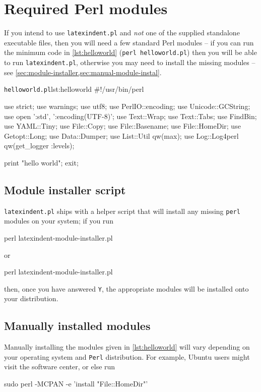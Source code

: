 \appendix
	\section{Required Perl modules}\label{sec:requiredmodules}
	 If you intend to use \texttt{latexindent.pl} and \emph{not} one of the
	 supplied standalone executable files, then you will need a few standard Perl modules --
	 if you can run the minimum code in \cref{lst:helloworld} (\texttt{perl helloworld.pl}) then you will be able to run
	 \texttt{latexindent.pl}, otherwise you may need to install the missing modules -- see
	 \cref{sec:module-installer,sec:manual-module-instal}.

	 \begin{cmhlistings}[style=tcblatex,language=Perl]{\texttt{helloworld.pl}}{lst:helloworld}
#!/usr/bin/perl

use strict;
use warnings;
use utf8;
use PerlIO::encoding;
use Unicode::GCString;
use open ':std', ':encoding(UTF-8)';
use Text::Wrap;
use Text::Tabs;
use FindBin;
use YAML::Tiny;
use File::Copy;
use File::Basename;
use File::HomeDir;
use Getopt::Long;
use Data::Dumper;
use List::Util qw(max);
use Log::Log4perl qw(get_logger :levels);

print "hello world";
exit;
\end{cmhlistings}

	\subsection{Module installer script}\label{sec:module-installer}
		 \texttt{latexindent.pl} ships with a helper script that will
		install any missing \texttt{perl} modules on your system; if you run
		\begin{commandshell}
perl latexindent-module-installer.pl
     \end{commandshell}
		or
		\begin{dosprompt}
perl latexindent-module-installer.pl
 \end{dosprompt}
		then, once you have answered \texttt{Y}, the appropriate modules will be
		installed onto your distribution.

	\subsection{Manually installed modules}\label{sec:manual-module-instal}
		Manually installing the modules given in \cref{lst:helloworld} will vary depending on
		your operating system and \texttt{Perl} distribution. For example, Ubuntu users
		might visit the software center, or else run
		\begin{commandshell}
sudo perl -MCPAN -e 'install "File::HomeDir"'
 \end{commandshell}

